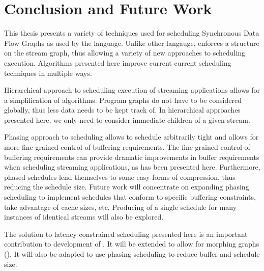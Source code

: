 \section{Conclusion and Future Work}

This thesis presents a variety of techniques used for scheduling
Synchronous Data Flow Graphs as used by the {\StreamIt} language.
Unlike other langauge, {\StreamIt} enforces a structure on the
stream graph, thus allowing a variety of new approaches to
scheduling execution. Algorithms presented here improve current
current scheduling techniques in multiple ways.

Hierarchical approach to scheduling execution of streaming
applications allows for a simplification of algorithms. Program
graphs do not have to be considered globally, thus less data needs
to be kept track of. In hierarchical approaches presented here, we
only need to consider immediate children of a given stream.

Phasing approach to scheduling allows to schedule arbitrarily
tight {\feedbackloops} and allows for more fine-grained control of
buffering requirements. The fine-grained control of buffering
requirements can provide dramatic improvements in buffer
requirements when scheduling streaming applications, as has been
presented here. Furthermore, phased schedules lend themselves to
some easy forms of compression, thus reducing the schedule size.
Future work will concentrate on expanding phasing scheduling to
implement schedules that conform to specific buffering
constraints, take advantage of cache sizes, etc. Producing of a
single schedule for many instances of identical streams will also
be explored.

The solution to latency constrained scheduling presented here is
an important contribution to development of {\StreamIt}. It will be
extended to allow for morphing graphs (\cite{thies02streamit}). It
will also be adapted to use phasing scheduling to reduce buffer
and schedule size.
